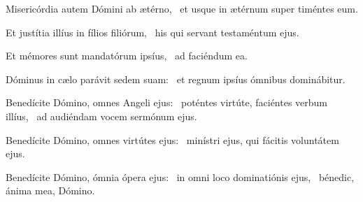 \item Misericórdia autem Dómini ab ætérno,~\psstar{} et usque in ætérnum super timéntes eum.

\item Et justítia illíus in fílios filiórum,~\psstar{} his qui servant testaméntum ejus.

\item Et mémores sunt mandatórum ipsíus,~\psstar{} ad faciéndum ea.

\item Dóminus in cælo parávit sedem suam:~\psstar{} et regnum ipsíus ómnibus dominábitur.

\item Benedícite Dómino, omnes Angeli ejus:~\pscross{} poténtes virtúte, faciéntes verbum illíus,~\psstar{} ad audiéndam vocem sermónum ejus.

\item Benedícite Dómino, omnes virtútes ejus:~\psstar{} minístri ejus, qui fácitis voluntátem ejus.

\item Benedícite Dómino, ómnia ópera ejus:~\pscross{} in omni loco dominatiónis ejus,~\psstar{} bénedic, ánima mea, Dómino.

